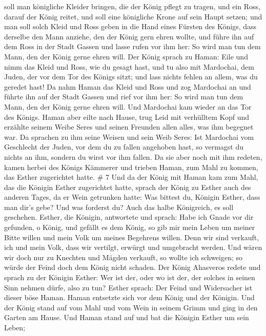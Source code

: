  soll man königliche Kleider bringen, die der König pflegt
zu tragen, und ein Ross, darauf der König reitet, und soll eine
königliche Krone auf sein Haupt setzen;  und man soll solch
Kleid und Ross geben in die Hand eines Fürsten des Königs, dass derselbe
den Mann anziehe, den der König gern ehren wollte, und führe ihn auf dem
Ross in der Stadt Gassen und lasse rufen vor ihm her: So wird man tun
dem Mann, den der König gerne ehren will.  Der König sprach
zu Haman: Eile und nimm das Kleid und Ross, wie du gesagt hast, und tu
also mit Mardochai, dem Juden, der vor dem Tor des Königs sitzt; und
lass nichts fehlen an allem, was du geredet hast!  Da nahm
Haman das Kleid und Ross und zog Mardochai an und führte ihn auf der
Stadt Gassen und rief vor ihm her: So wird man tun dem Mann, den der
König gerne ehren will.  Und Mardochai kam wieder an das
Tor des Königs. Haman aber eilte nach Hause, trug Leid mit verhülltem
Kopf  und erzählte seinem Weibe Seres und seinen Freunden
allen alles, was ihm begegnet war. Da sprachen zu ihm seine Weisen und
sein Weib Seres: Ist Mardochai vom Geschlecht der Juden, vor dem du zu
fallen angehoben hast, so vermagst du nichts an ihm, sondern du wirst
vor ihm fallen.  Da sie aber noch mit ihm redeten, kamen
herbei des Königs Kämmerer und trieben Haman, zum Mahl zu kommen, das
Esther zugerichtet hatte. \# 7  Und da der König mit Haman
kam zum Mahl, das die Königin Esther zugerichtet hatte, 
sprach der König zu Esther auch des anderen Tages, da er Wein getrunken
hatte: Was bittest du, Königin Esther, dass man dir's gebe? Und was
forderst du? Auch das halbe Königreich, es soll geschehen. 
Esther, die Königin, antwortete und sprach: Habe ich Gnade vor dir
gefunden, o König, und gefällt es dem König, so gib mir mein Leben um
meiner Bitte willen und mein Volk um meines Begehrens willen.
 Denn wir sind verkauft, ich und mein Volk, dass wir
vertilgt, erwürgt und umgebracht werden. Und wären wir doch nur zu
Knechten und Mägden verkauft, so wollte ich schweigen; so würde der
Feind doch dem König nicht schaden.  Der König Ahasveros
redete und sprach zu der Königin Esther: Wer ist der, oder wo ist der,
der solches in seinen Sinn nehmen dürfe, also zu tun? 
Esther sprach: Der Feind und Widersacher ist dieser böse Haman. Haman
entsetzte sich vor dem König und der Königin.  Und der König
stand auf vom Mahl und vom Wein in seinem Grimm und ging in den Garten
am Hause. Und Haman stand auf und bat die Königin Esther um sein Leben;
